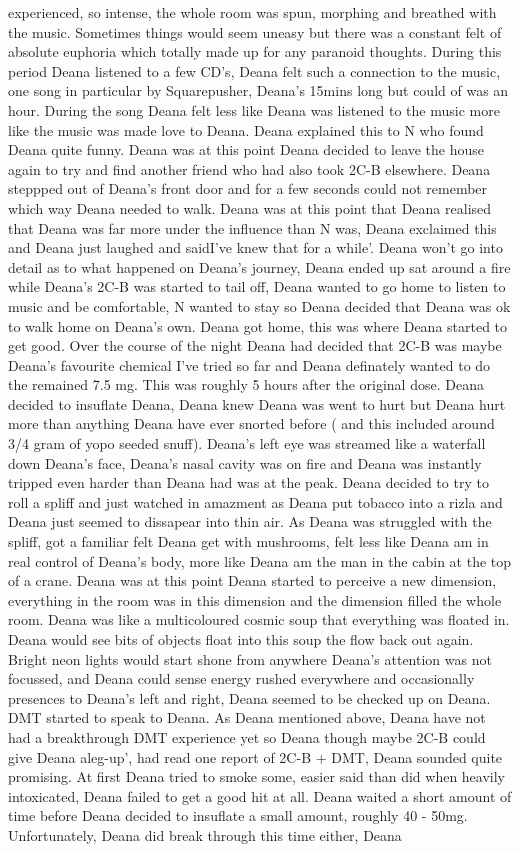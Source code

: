 \documentclass[12pt]{book}
\begin{document}
experienced, so intense, the whole room was spun, morphing and breathed with the music. Sometimes things would seem uneasy but there was a constant felt of absolute euphoria which totally made up for any paranoid thoughts. During this period Deana listened to a few CD's, Deana felt such a connection to the music, one song in particular by Squarepusher, Deana's 15mins long but could of was an hour. During the song Deana felt less like Deana was listened to the music more like the music was made love to Deana. Deana explained this to N who found Deana quite funny. Deana was at this point Deana decided to leave the house again to try and find another friend who had also took 2C-B elsewhere. Deana steppped out of Deana's front door and for a few seconds could not remember which way Deana needed to walk. Deana was at this point that Deana realised that Deana was far more under the influence than N was, Deana exclaimed this and Deana just laughed and saidI've knew that for a while'. Deana won't go into detail as to what happened on Deana's journey, Deana ended up sat around a fire while Deana's 2C-B was started to tail off, Deana wanted to go home to listen to music and be comfortable, N wanted to stay so Deana decided that Deana was ok to walk home on Deana's own. Deana got home, this was where Deana started to get good. Over the course of the night Deana had decided that 2C-B was maybe Deana's favourite chemical I've tried so far and Deana definately wanted to do the remained 7.5 mg. This was roughly 5 hours after the original dose. Deana decided to insuflate Deana, Deana knew Deana was went to hurt but Deana hurt more than anything Deana have ever snorted before ( and this included around 3/4 gram of yopo seeded snuff). Deana's left eye was streamed like a waterfall down Deana's face, Deana's nasal cavity was on fire and Deana was instantly tripped even harder than Deana had was at the peak. Deana decided to try to roll a spliff and just watched in amazment as Deana put tobacco into a rizla and Deana just seemed to dissapear into thin air. As Deana was struggled with the spliff, got a familiar felt Deana get with mushrooms, felt less like Deana am in real control of Deana's body, more like Deana am the man in the cabin at the top of a crane. Deana was at this point Deana started to perceive a new dimension, everything in the room was in this dimension and the dimension filled the whole room. Deana was like a multicoloured cosmic soup that everything was floated in. Deana would see bits of objects float into this soup the flow back out again. Bright neon lights would start shone from anywhere Deana's attention was not focussed, and Deana could sense energy rushed everywhere and occasionally presences to Deana's left and right, Deana seemed to be checked up on Deana. DMT started to speak to Deana. As Deana mentioned above, Deana have not had a breakthrough DMT experience yet so Deana though maybe 2C-B could give Deana aleg-up', had read one report of 2C-B + DMT, Deana sounded quite promising. At first Deana tried to smoke some, easier said than did when heavily intoxicated, Deana failed to get a good hit at all. Deana waited a short amount of time before Deana decided to insuflate a small amount, roughly 40 - 50mg. Unfortunately, Deana did break through this time either, Deana 
\end{document}
